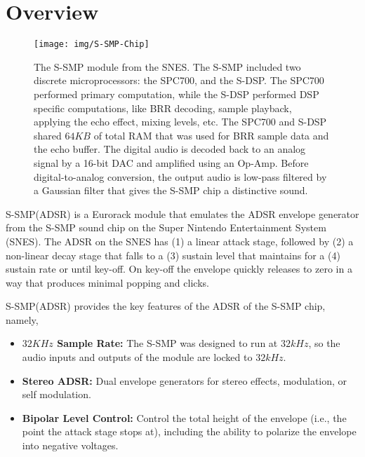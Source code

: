 \documentclass[12pt,letter]{article}
\begin{document}


\section{Overview}

\begin{figure}[!htp]
\centering
\texttt{[image: img/S-SMP-Chip]}
\caption{The S-SMP module from the SNES. The S-SMP included two discrete microprocessors: the SPC700, and the S-DSP. The SPC700 performed primary computation, while the S-DSP performed DSP specific computations, like BRR decoding, sample playback, applying the echo effect, mixing levels, etc. The SPC700 and S-DSP shared $64KB$ of total RAM that was used for BRR sample data and the echo buffer. The digital audio is decoded back to an analog signal by a 16-bit DAC and amplified using an Op-Amp. Before digital-to-analog conversion, the output audio is low-pass filtered by a Gaussian filter that gives the S-SMP chip a distinctive sound.}
\end{figure}

\clearpage

S-SMP(ADSR) is a Eurorack module that emulates the ADSR envelope generator from the S-SMP sound chip on the Super Nintendo Entertainment System (SNES). The ADSR on the SNES has (1) a linear attack stage, followed by (2) a non-linear decay stage that falls to a (3) sustain level that maintains for a (4) sustain rate or until key-off. On key-off the envelope quickly releases to zero in a way that produces minimal popping and clicks.

S-SMP(ADSR) provides the key features of the ADSR of the S-SMP chip,
namely,
\begin{itemize}
  \item \textbf{$32KHz$ Sample Rate:} The S-SMP was designed to run at $32kHz$, so the audio inputs and outputs of the module are locked to $32kHz$.
  \item \textbf{Stereo ADSR:} Dual envelope generators for stereo effects, modulation, or self modulation.
  \item \textbf{Bipolar Level Control:} Control the total height of the envelope (i.e., the point the attack stage stops at), including the ability to polarize the envelope into negative voltages.
\end{itemize}
\end{document}
